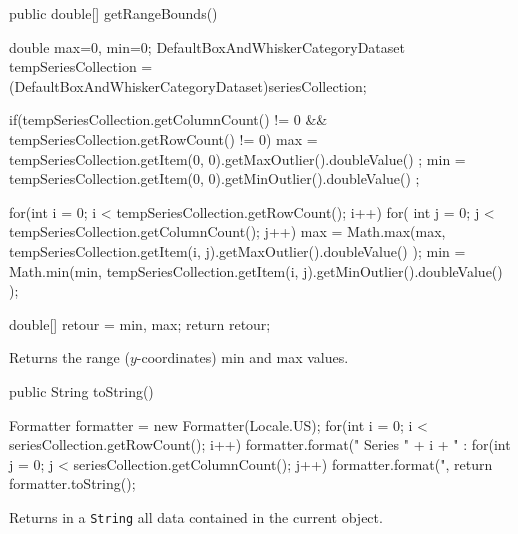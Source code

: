 \begin{htmlonly}
\end{htmlonly}
\begin{code}

   public double[] getRangeBounds() \begin{hide} {
      double max=0, min=0;
      DefaultBoxAndWhiskerCategoryDataset tempSeriesCollection =
            (DefaultBoxAndWhiskerCategoryDataset)seriesCollection;

      if(tempSeriesCollection.getColumnCount() != 0 && tempSeriesCollection.getRowCount() != 0) {
         max = tempSeriesCollection.getItem(0, 0).getMaxOutlier().doubleValue() ;
         min = tempSeriesCollection.getItem(0, 0).getMinOutlier().doubleValue() ;
      }

      for(int i = 0; i < tempSeriesCollection.getRowCount(); i++) {
         for( int j = 0; j < tempSeriesCollection.getColumnCount(); j++) {
            max = Math.max(max, tempSeriesCollection.getItem(i, j).getMaxOutlier().doubleValue() );
            min = Math.min(min, tempSeriesCollection.getItem(i, j).getMinOutlier().doubleValue() );
         }
      }

      double[] retour = {min, max};
      return retour;
   }\end{hide}
\end{code}
\begin{tabb}
   Returns the range ($y$-coordinates) min and max values.
\end{tabb}
\begin{htmlonly}
\end{htmlonly}
\begin{code}

   public String toString() \begin{hide} {
      Formatter formatter = new Formatter(Locale.US);
      for(int i = 0; i < seriesCollection.getRowCount(); i++) {
         formatter.format(" Series " + i + " : %
         for(int j = 0; j < seriesCollection.getColumnCount(); j++)
            formatter.format(",%
      }
      return formatter.toString();
   }\end{hide}
\end{code}
\begin{tabb}
  Returns in a \texttt{String} all data contained in the current object.
\end{tabb}
\begin{htmlonly}
\end{htmlonly}

